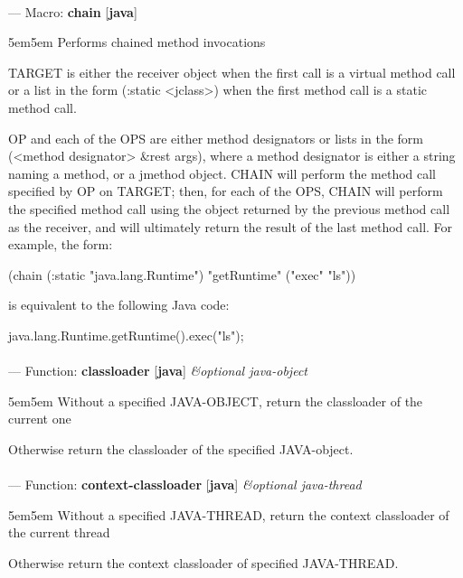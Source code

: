 \paragraph{}
\label{JAVA:CHAIN}
--- Macro: \textbf{chain} [\textbf{java}] \textit{}

\begin{adjustwidth}{5em}{5em}
Performs chained method invocations

TARGET is either the receiver object when the first call is a virtual method
call or a list in the form (:static <jclass>) when the first method
call is a static method call. 

OP and each of the OPS are either method designators or lists in the
form (<method designator> \&rest args), where a method designator is
either a string naming a method, or a jmethod object. CHAIN will
perform the method call specified by OP on TARGET; then, for each
of the OPS, CHAIN will perform the specified method call using the
object returned by the previous method call as the receiver, and will
ultimately return the result of the last method call.  For example,
the form:

  (chain (:static "java.lang.Runtime") "getRuntime" ("exec" "ls"))

is equivalent to the following Java code:

  java.lang.Runtime.getRuntime().exec("ls");
\end{adjustwidth}

\paragraph{}
\label{JAVA:CLASSLOADER}
--- Function: \textbf{classloader} [\textbf{java}] \textit{\&optional java-object}

\begin{adjustwidth}{5em}{5em}
Without a specified JAVA-OBJECT, return the classloader of the current one

Otherwise return the classloader of the specified JAVA-object.
\end{adjustwidth}

\paragraph{}
\label{JAVA:CONTEXT-CLASSLOADER}
--- Function: \textbf{context-classloader} [\textbf{java}] \textit{\&optional java-thread}

\begin{adjustwidth}{5em}{5em}
Without a specified JAVA-THREAD, return the context classloader of the current thread

Otherwise return the context classloader of specified JAVA-THREAD.
\end{adjustwidth}

